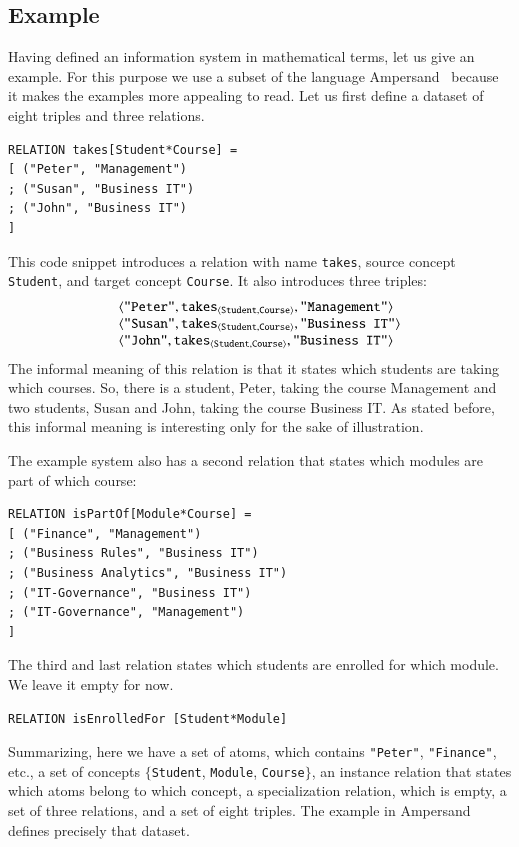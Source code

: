 \documentclass{elsarticle}
\begin{document}
\subsection{Example}
\label{As-is IS}
	Having defined an information system in mathematical terms, let us give an example.
	For this purpose we use a subset of the language Ampersand~\cite{Joosten-JLAMP2018}
	because it makes the examples more appealing to read.
	Let us first define a dataset of eight triples and three relations.
\begin{verbatim}
RELATION takes[Student*Course] =
[ ("Peter", "Management")
; ("Susan", "Business IT")
; ("John", "Business IT")
]
\end{verbatim}
	This code snippet introduces a relation with name \verb#takes#,
	source concept \verb#Student#, and
	target concept \verb#Course#.
	It also introduces three triples:
\[\begin{array}{l}
	\langle{\text{\tt "Peter"}},{\text{\it \text{\tt takes}\/}_{\langle{\text{\tt Student}},{\text{\tt Course}}\rangle}},{\text{\tt "Management"}}\rangle\\
	\langle{\text{\tt "Susan"}},{\text{\it \text{\tt takes}\/}_{\langle{\text{\tt Student}},{\text{\tt Course}}\rangle}},{\text{\tt "Business IT"}}\rangle\\
	\langle{\text{\tt "John"}},{\text{\it \text{\tt takes}\/}_{\langle{\text{\tt Student}},{\text{\tt Course}}\rangle}},{\text{\tt "Business IT"}}\rangle\\
\end{array}\]
	The informal meaning of this relation is that it states which students are taking which courses.
	So, there is a student, Peter, taking the course Management and two students, Susan and John, taking the course Business IT.
	As stated before, this informal meaning is interesting only for the sake of illustration.

	The example system also has a second relation that states which modules are part of which course:

\begin{verbatim}
RELATION isPartOf[Module*Course] =
[ ("Finance", "Management")
; ("Business Rules", "Business IT")
; ("Business Analytics", "Business IT")
; ("IT-Governance", "Business IT")
; ("IT-Governance", "Management")
]
\end{verbatim}
	The third and last relation states which students are enrolled for which module.
	We leave it empty for now.
\begin{verbatim}
RELATION isEnrolledFor [Student*Module]
\end{verbatim}
	Summarizing, here we have a set of atoms, which contains \verb-"Peter"-, \verb-"Finance"-, etc.,
	a set of concepts $\{$\verb-Student-, \verb-Module-, \verb-Course-$\}$,
	an instance relation that states which atoms belong to which concept,
	a specialization relation, which is empty,
	a set of three relations, and
	a set of eight triples.
	The example in Ampersand defines precisely that dataset.
	
\end{document}
